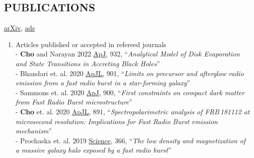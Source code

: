 \documentclass[margin, 10pt]{res} %
\begin{document}
\begin{resume}


\section{PUBLICATIONS}
\href{https://arxiv.org/search/advanced?advanced=&terms-0-operator=AND&terms-0-term=Hyerin+Cho&terms-0-field=author&classification-physics_archives=all&classification-include_cross_list=include&date-filter_by=all_dates&date-year=&date-from_date=&date-to_date=&date-date_type=submitted_date&abstracts=show&size=50&order=-announced_date_first}{arXiv}, \href{https://ui.adsabs.harvard.edu/search/q=orcid\%3A\%220000-0002-2858-9481\%22&sort=date\%20desc\%2C\%20bibcode\%20desc&p_=0}{ads}
\begin{enumerate}
    \item Articles published or accepted in refereed journals\\
    - \textbf{Cho} and Narayan 2022 \href{https://iopscience.iop.org/article/10.3847/1538-4357/ac6d5c}{ApJ}, 932, ``{\sl Analytical Model of Disk Evaporation and State Transitions in Accreting Black Holes}''\\
    - Bhandari et. al. 2020 \href{https://iopscience.iop.org/article/10.3847/2041-8213/abb462}{ApJL}, 901, ``{\sl Limits on precursor and afterglow radio emission from a fast radio burst in a star-forming galaxy}''\\
    - Sammons et. al. 2020 \href{https://iopscience.iop.org/article/10.3847/1538-4357/aba7bb}{ApJ}, 900, ``{\sl First constraints on compact dark matter from Fast Radio Burst microstructure}''\\
    - \textbf{Cho} et. al. 2020 \href{https://iopscience.iop.org/article/10.3847/2041-8213/ab7824/pdf}{ApJL}, 891, ``{\sl Spectropolarimetric analysis of FRB\,181112 at microsecond resolution: Implications for Fast Radio Burst emission mechanism}''\\
    - Prochaska et. al. 2019 \href{https://science.sciencemag.org/content/366/6462/231/tab-pdf}{Science}, 366, ``{\sl The low density and magnetization of a massive galaxy halo exposed by a fast radio burst}''\\
    

\end{enumerate}
\end{resume}
\end{document}
